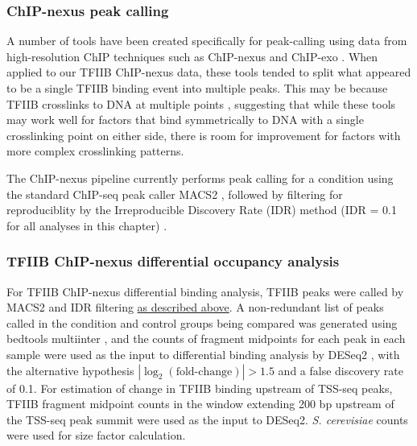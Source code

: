 \subsubsection{ChIP-nexus peak calling}
\label{subsubsec:nexus_peak_calling}

A number of tools have been created specifically for peak-calling using data from high-resolution ChIP techniques such as ChIP-nexus and ChIP-exo \citep{wang2014, hansen2016}.
When applied to our TFIIB ChIP-nexus data, these tools tended to split what appeared to be a single TFIIB binding event into multiple peaks.
This may be because TFIIB crosslinks to DNA at multiple points \citep{rhee2012}, suggesting that while these tools may work well for factors that bind symmetrically to DNA with a single crosslinking point on either side, there is room for improvement for factors with more complex crosslinking patterns.

The ChIP-nexus pipeline currently performs peak calling for a condition using the standard ChIP-seq peak caller MACS2 \citep{zhang2008}, followed by filtering for reproduciblity by the Irreproducible Discovery Rate (IDR) method (IDR = 0.1 for all analyses in this chapter) \citep{li2011}.

\subsubsection{TFIIB ChIP-nexus differential occupancy analysis}
\label{subsubsec:nexus_differential_occupancy}
For TFIIB ChIP-nexus differential binding analysis, TFIIB peaks were called by MACS2 and IDR filtering \hyperref[subsubsec:tfiib_peak_calling]{as described above}.
A non-redundant list of peaks called in the condition and control groups being compared was generated using bedtools multiinter \citep{quinlan2010}, and the counts of fragment midpoints for each peak in each sample were used as the input to differential binding analysis by DESeq2 \citep{love2014}, with the alternative hypothesis $\allowbreak \left\lvert\log_2 \left(\text{fold-change}\right) \right\rvert > 1.5$ and a false discovery rate of 0.1.
For estimation of change in TFIIB binding upstream of TSS-seq peaks, TFIIB fragment midpoint counts in the window extending 200 bp upstream of the TSS-seq peak summit were used as the input to DESeq2.
\textit{S. cerevisiae} counts were used for size factor calculation.

